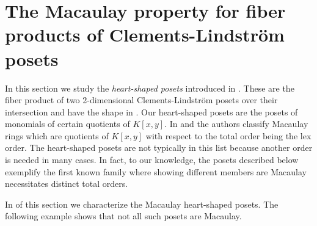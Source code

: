 \documentclass[11pt, reqno]{amsart}
\theoremstyle{plain} %
\theoremstyle{definition}
\theoremstyle{remark}
\numberwithin{equation}{section}  %
\begin{document}
\section{The Macaulay property for fiber products of Clements-Lindstr\"om  posets}\label{s: fiber box}

In this section we study the {\em heart-shaped posets} introduced in . These are the fiber product of two 2-dimensional Clements-Lindstr\"om posets over their intersection and have the shape in . Our heart-shaped posets are the posets of monomials of certain quotients of $K[x,y]$. In \cite{Abdelfatah} and \cite{He} the authors classify Macaulay rings which are quotients of $K[x,y]$ with respect to the total order being the lex order. The heart-shaped posets are not typically in this list because another order is needed in many cases. In fact, to our knowledge, the posets described below exemplify the first known family where showing different members are Macaulay necessitates distinct total orders.




In  of this section we characterize the Macaulay heart-shaped posets. The following example shows that not all such posets are Macaulay.
\end{document}
